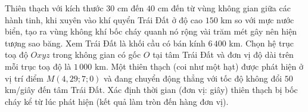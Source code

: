 \begin{bt}%
	Thiên thạch với kích thước $30$ cm đến $40$ cm đến từ vùng không gian giữa các hành tinh, khi xuyên vào khí quyển Trái Đất ở độ cao $150$ km so với mực nước biển, tạo ra vùng không khí bốc cháy quanh nó rộng vài trăm mét gây nên hiện tượng sao băng. Xem Trái Đất là khối cầu có bán kính $6\,400$ km. Chọn hệ trục toạ độ $Oxyz$ trong không gian có gốc $O$ tại tâm Trái Đất và đơn vị độ dài trên mỗi trục toạ độ là $1\,000$ km. Một thiên thạch (coi như một hạt) được phát hiện ở vị trí điểm $M\left(4{,}29;7;0\right)$ và đang chuyển  động thẳng với tốc độ không đổi $50$ km/giây đến tâm Trái Đất. Xác định thời gian (đơn vị: giây) thiên thạch bị bốc cháy kể từ lúc phát hiện (kết quả làm tròn đến hàng đơn vị).
\end{bt}

